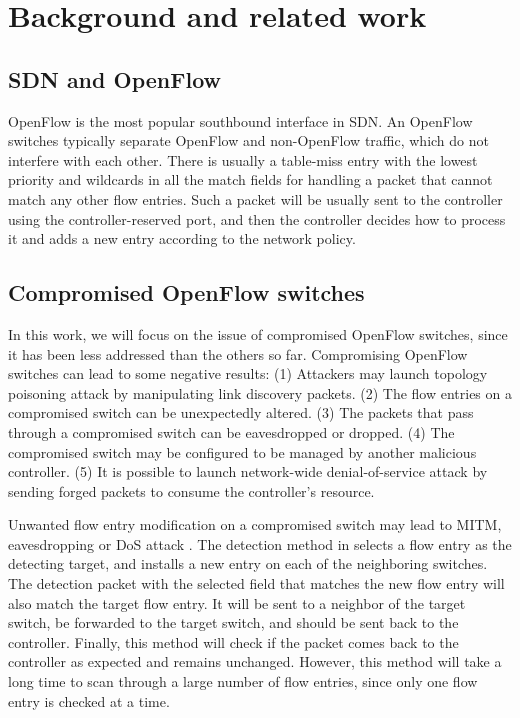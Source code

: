 \documentclass[conference]{IEEEtran}
\begin{document}
\section{Background and related work}
\subsection{SDN and OpenFlow}
\label{SDN and OpenFlow}
OpenFlow is the most popular southbound interface in SDN. An OpenFlow switches typically separate OpenFlow and non-OpenFlow traffic, which do not interfere with each other. There is usually a table-miss entry with the lowest priority and wildcards in all the match fields for handling a packet that cannot match any other flow entries. Such a packet will be usually sent to the controller using the controller-reserved port, and then the controller decides how to process it and adds a new entry according to the network policy. 

\subsection{Compromised OpenFlow switches}
In this work, we will focus on the issue of compromised OpenFlow switches, since it has been less addressed than the others so far. Compromising OpenFlow switches can lead to some negative results: (1) Attackers may launch topology poisoning attack by manipulating link discovery packets. (2) The flow entries on a compromised switch can be unexpectedly altered. (3) The packets that pass through a compromised switch can be eavesdropped or dropped. (4) The compromised switch may be configured to be managed by another malicious controller. (5) It is possible to launch network-wide denial-of-service attack by sending forged packets to consume the controller's resource. 

Unwanted flow entry modification on a compromised switch may lead to MITM, eavesdropping or DoS attack \cite{AAS14}. The detection method in \cite{CKGL15} selects a flow entry as the detecting target, and installs a new entry on each of the neighboring switches. The detection packet with the selected field that matches the new flow entry will also match the target flow entry. It will be sent to a neighbor of the target switch, be forwarded to the target switch, and should be sent back to the controller. Finally, this method will check if the packet comes back to the controller as expected and remains unchanged. However, this method will take a long time to scan through a large number of flow entries, since only one flow entry is checked at a time.
\end{document}
